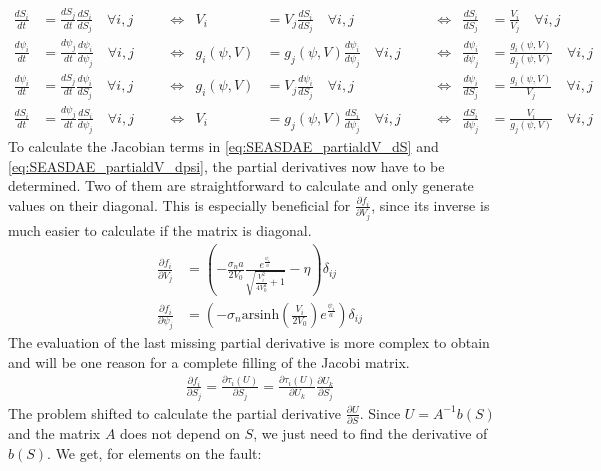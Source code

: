 \documentclass{report}
\begin{document}
\begin{align}
\frac{dS_i}{dt} &= \frac{dS_j}{dt}\frac{dS_i}{dS_j} \quad\forall i,j \quad&&\Leftrightarrow& V_i &= V_j \frac{dS_i}{dS_j} \quad\forall i,j \quad&&\Leftrightarrow& \frac{dS_i}{dS_j} &= \frac{V_i}{V_j} \quad\forall i,j \\
\frac{d\psi_i}{dt} &= \frac{d\psi_j}{dt}\frac{d\psi_i}{d\psi_j} \quad\forall i,j \quad&&\Leftrightarrow& g_i(\psi, V) &= g_j(\psi, V) \frac{d\psi_i}{d\psi_j} \quad\forall i,j \quad&&\Leftrightarrow& \frac{d\psi_i}{d\psi_j} &= \frac{g_i(\psi, V)}{g_j(\psi, V)} \quad\forall i,j \\
\frac{d\psi_i}{dt} &= \frac{dS_j}{dt}\frac{d\psi_i}{dS_j} \quad\forall i,j \quad&&\Leftrightarrow& g_i(\psi, V) &= V_j \frac{d\psi_i}{dS_j} \quad\forall i,j \quad&&\Leftrightarrow& \frac{d\psi_i}{dS_j} &= \frac{g_i(\psi, V)}{V_j} \quad\forall i,j \\
\frac{dS_i}{dt} &= \frac{d\psi_j}{dt}\frac{dS_i}{d\psi_j} \quad\forall i,j\quad&&\Leftrightarrow& V_i &= g_j(\psi, V) \frac{dS_i}{d\psi_j} \quad\forall i,j\quad&&\Leftrightarrow& \frac{dS_i}{d\psi_j} &= \frac{V_i}{g_j(\psi, V)}\quad\forall i,j
\end{align}
To calculate the Jacobian terms in \autoref{eq:SEASDAE_partialdV_dS} and \autoref{eq:SEASDAE_partialdV_dpsi}, the partial derivatives now have to be determined. Two of them are straightforward to calculate and only generate values on their diagonal. This is especially beneficial for $\frac{\partial f_i}{\partial V_j}$, since its inverse is much easier to calculate if the matrix is diagonal. 
\begin{align}
    \frac{\partial f_i}{\partial V_j} &= \left( -\frac{\sigma_na}{2V_0} \frac{e^{\frac{\psi_i}{a}}}{\sqrt{\frac{V_i^2}{4V_0^2}+1}}-\eta\right)\delta_{ij} \\
    \frac{\partial f_i}{\partial \psi_j} &= \left(-\sigma_n\text{arsinh}\left(\frac{V_i}{2V_0}\right)e^{\frac{\psi_i}{a}}\right)\delta_{ij}
\end{align}
The evaluation of the last missing partial derivative is more complex to obtain and will be one reason for a complete filling of the Jacobi matrix.
\begin{align}
	\label{eq:partialDerivative_df_dS}
    \frac{\partial f_i}{\partial S_j} = \frac{\partial \tau_i(U)}{\partial S_j} = \frac{\partial \tau_i(U)}{\partial U_k}\frac{\partial U_k}{\partial S_j}
\end{align}
The problem shifted to calculate the partial derivative $\frac{\partial U}{\partial S}$. Since $U = A^{-1}b(S)$ and the matrix $A$ does not depend on $S$, we just need to find the derivative of $b(S)$. We get, for elements on the fault:
\end{document}
